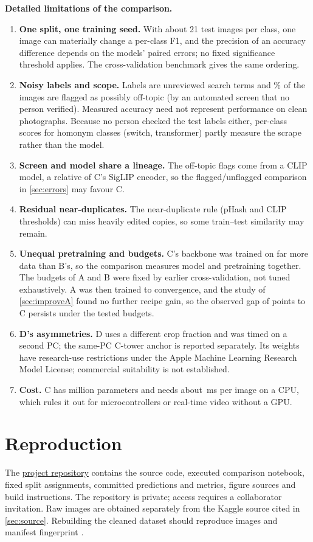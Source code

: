 \documentclass[11pt,a4paper]{article}
\newcommand{\cls}[1]{#1}
\begin{document}
\FloatBarrier\clearpage
\textbf{Detailed limitations of the comparison.}
\begin{enumerate}[leftmargin=*]
\item \textbf{One split, one training seed.} With about 21 test images per class, one image can materially change a per-class F1, and the precision of an accuracy difference depends on the models' paired errors; no fixed significance threshold applies. The cross-validation benchmark
gives the same ordering.
\item \textbf{Noisy labels and scope.} Labels are unreviewed search terms and \pctOOD\% of the images are flagged as
possibly off-topic (by an automated screen that no person verified). Measured accuracy need not represent
performance on clean photographs. Because no person checked the test labels either, per-class scores for homonym
classes (\cls{switch}, \cls{transformer}) partly measure the scrape rather than the model.
\item \textbf{Screen and model share a lineage.} The off-topic flags come from a CLIP model, a relative of C's
SigLIP encoder, so the flagged/unflagged comparison in \cref{sec:errors} may favour C.
\item \textbf{Residual near-duplicates.} The near-duplicate rule (pHash and CLIP thresholds) can miss heavily edited
copies, so some train--test similarity may remain.
\item \textbf{Unequal pretraining and budgets.} C's backbone was trained on far more data than B's, so the comparison
measures model and pretraining together. The budgets of A and B were fixed by earlier cross-validation, not tuned
exhaustively. A was then trained to convergence, and the study of \cref{sec:improveA} found no further recipe gain,
so the observed gap of \diffCA points to C persists under the tested budgets.
\item \textbf{D's asymmetries.} D uses a different crop fraction and was timed on a second PC; the
same-PC C-tower anchor is reported separately. Its weights have research-use restrictions under the Apple Machine Learning Research Model License; commercial suitability is not established.
\item \textbf{Cost.} C has \paramsMC million parameters and needs about \cpuMsC\,ms per image on a CPU, which rules it
out for microcontrollers or real-time video without a GPU.
\end{enumerate}

\FloatBarrier\clearpage
\section{Reproduction}\label{app:repro}
The \href{https://github.com/Vaperizer2/626-Project}{project repository} contains the source code, executed
comparison notebook, fixed split assignments, committed predictions and metrics, figure sources and build instructions.
The repository is private; access requires a collaborator invitation. Raw images are obtained separately from the
Kaggle source cited in \cref{sec:source}. Rebuilding the cleaned dataset should reproduce \nRows images and manifest
fingerprint \fingerprint.
\end{document}
